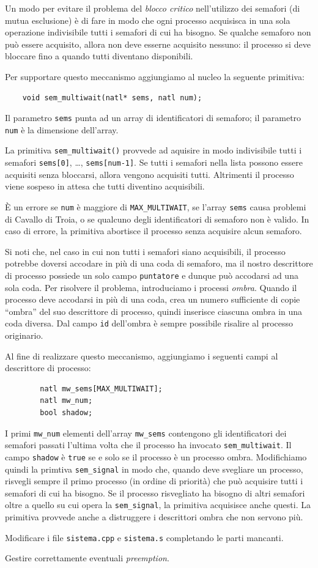 Un modo per evitare il problema del {\em blocco critico} nell'utilizzo dei semafori (di mutua esclusione) \`e di
fare in modo che ogni processo acquisisca in una sola operazione indivisibile tutti i semafori di cui ha bisogno. Se qualche semaforo
non pu\`o essere acquisito, allora non deve esserne acquisito nessuno: il processo si deve bloccare fino a quando tutti
diventano disponibili.

Per supportare questo meccanismo aggiungiamo al nucleo la seguente primitiva:
\begin{verbatim}
    void sem_multiwait(natl* sems, natl num);
\end{verbatim}
Il parametro \verb|sems| punta ad un array di identificatori di semaforo; il parametro \verb|num| \`e la dimensione dell'array.

La primitiva \verb|sem_multiwait()| provvede ad aquisire in modo indivisibile tutti i semafori \verb|sems[0]|, \dots, \verb|sems[num-1]|.
Se tutti i semafori nella lista possono essere acquisiti
senza bloccarsi, allora vengono acquisiti tutti. Altrimenti il processo viene sospeso
in attesa che tutti diventino acquisibili.

\`E un errore se \verb|num| \`e maggiore di \verb|MAX_MULTIWAIT|, se l'array \verb|sems| causa problemi di Cavallo di Troia,
o se qualcuno degli identificatori di semaforo non \`e valido. In caso di errore, la primitiva abortisce il processo senza
acquisire alcun semaforo.

Si noti che, nel caso in cui non tutti i semafori siano acquisibili, il processo potrebbe doversi accodare in pi\`u di una coda
di semaforo, ma il nostro descrittore di processo possiede un solo campo \verb|puntatore| e dunque pu\`o accodarsi ad una sola coda.
Per risolvere il problema, introduciamo i processi {\em ombra}. Quando il processo deve accodarsi in pi\`u di una coda, crea
un numero sufficiente di copie ``ombra'' del suo descrittore di processo, quindi inserisce ciascuna ombra in una coda diversa.
Dal campo \verb|id| dell'ombra \`e sempre possibile risalire al processo originario.

Al fine di realizzare questo meccanismo, aggiungiamo i seguenti campi al descrittore di processo:
\begin{verbatim}
        natl mw_sems[MAX_MULTIWAIT];
        natl mw_num;
        bool shadow;
\end{verbatim}
I primi \verb|mw_num| elementi dell'array \verb|mw_sems| contengono gli identificatori dei semafori passati l'ultima volta
che il processo ha invocato \verb|sem_multiwait|. Il campo \verb|shadow| \`e \verb|true| se e solo se il processo \`e un processo
ombra.
Modifichiamo quindi la primtiva \verb|sem_signal| in modo che, quando deve svegliare un processo,
risvegli sempre il primo processo (in ordine di priorit\`a) che pu\`o acquisire tutti i semafori di cui ha bisogno.
Se il processo risvegliato ha bisogno di altri semafori oltre a quello su cui opera la \verb|sem_signal|, la primitiva
acquisisce anche questi. La primitiva provvede anche a distruggere i descrittori ombra che non servono pi\`u.

Modificare i file \verb|sistema.cpp| e \verb|sistema.s| completando le parti mancanti.

Gestire correttamente eventuali {\em preemption}.
